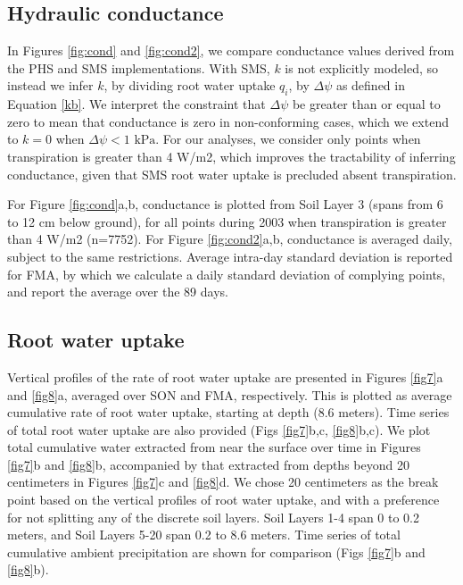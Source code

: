 \documentclass[draft,linenumbers]{agujournal}
\begin{document}
\subsection{Hydraulic conductance}

    In Figures \ref{fig:cond} and \ref{fig:cond2}, we compare conductance values derived from the PHS and SMS implementations.
    With SMS, $k$ is not explicitly modeled, so instead we infer $k$, 
    by dividing root water uptake $q_i$, by $\Delta\psi$ as defined in Equation \ref{kb}.
    We interpret the constraint that $\Delta\psi$ be greater than or equal to zero to mean 
    that conductance is zero in non-conforming cases, which we extend to $k=0$ when $\Delta\psi<\text{1 kPa}$.
    For our analyses, we consider only points when transpiration is greater than 4 W/m2, which improves the tractability of inferring conductance,
    given that SMS root water uptake is precluded absent transpiration. 
    
    For Figure \ref{fig:cond}a,b, conductance is plotted from Soil Layer 3 (spans from 6 to 12 cm below ground),
     for all points during 2003 when transpiration is greater than 4 W/m2 (n=7752).
    For Figure \ref{fig:cond2}a,b, conductance is averaged daily, subject to the same restrictions.
    Average intra-day standard deviation is reported for FMA, by which we calculate a daily standard deviation of complying points, and report the average over the 89 days.


\subsection{Root water uptake}

    Vertical profiles of the rate of root water uptake are presented in Figures \ref{fig7}a and \ref{fig8}a, averaged over SON and FMA, respectively.
    This is plotted as average cumulative rate of root water uptake, starting at depth (8.6 meters).
    Time series of total root water uptake are also provided (Figs \ref{fig7}b,c, \ref{fig8}b,c).
    We plot total cumulative water extracted from near the surface over time in Figures \ref{fig7}b and \ref{fig8}b, 
    accompanied by that extracted from depths beyond 20 centimeters in Figures \ref{fig7}c and \ref{fig8}d.
    We chose 20 centimeters as the break point based on the vertical profiles of root water uptake, and with a preference for not splitting any of the discrete soil layers.
    Soil Layers 1-4 span 0 to 0.2 meters, and Soil Layers 5-20 span 0.2 to 8.6 meters.
    Time series of total cumulative ambient precipitation are shown for comparison (Figs \ref{fig7}b and \ref{fig8}b).
    
\end{document}
